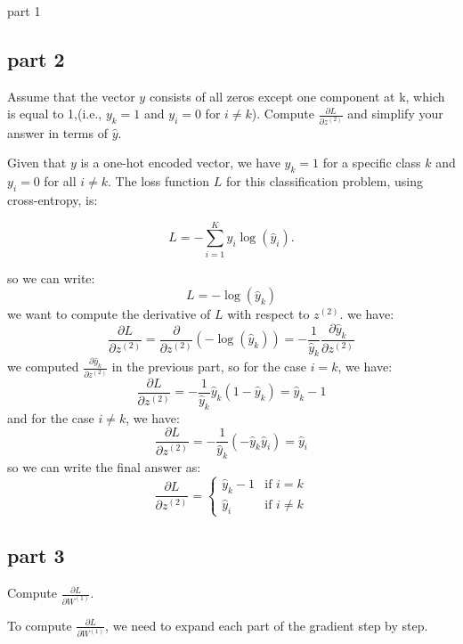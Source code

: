 \begin{subsection}{part 1}
\subsection{part 2}
Assume that the vector \( y \) consists of all zeros except one component at k, which is equal to 1,(i.e., $y_k = 1$ and $y_i = 0$ for $i \neq k$). Compute $\frac{\partial L}{\partial z^{(2)}}$ and simplify your answer in terms of $\hat{y}$.
\begin{qsolve}
	\begin{qsolve}[]
		Given that \( y \) is a one-hot encoded vector, we have \( y_k = 1 \) for a specific class \( k \) and \( y_i = 0 \) for all \( i \neq k \). The loss function \( L \) for this classification problem, using cross-entropy, is:

		\[
		L = -\sum_{i=1}^K y_i \log(\hat{y}_i).
		\]
		
		so we can write:
		\[
		L = -\log(\hat{y}_k)
		\]
		we want to compute the derivative of \( L \) with respect to \( z^{(2)} \). we have:
		\[
		\frac{\partial L}{\partial z^{(2)}} = \frac{\partial}{\partial z^{(2)}} \left( -\log(\hat{y}_k) \right) = -\frac{1}{\hat{y}_k} \frac{\partial \hat{y}_k}{\partial z^{(2)}}
		\]
		we computed \( \frac{\partial \hat{y}_k}{\partial z^{(2)}} \) in the previous part, so for the case \( i = k \), we have:
		\[
		\frac{\partial L}{\partial z^{(2)}} = -\frac{1}{\hat{y}_k} \hat{y}_k \left( 1 - \hat{y}_k \right) = \hat{y}_k - 1
		\]
		and for the case \( i \neq k \), we have:
		\splitqsolve[\splitqsolve]
		\[
		\frac{\partial L}{\partial z^{(2)}} = -\frac{1}{\hat{y}_k} \left( -\hat{y}_k \hat{y}_i \right) = \hat{y}_i
		\]
		so we can write the final answer as:
		\[
		\frac{\partial L}{\partial z^{(2)}} = \begin{cases}
			\hat{y}_k - 1 & \text{if } i = k\\
			\hat{y}_i & \text{if } i \neq k
		\end{cases}
		\]


	\end{qsolve}
\end{qsolve}
\subsection{part 3}
Compute \( \frac{\partial L}{\partial W^{(1)}} \).
\begin{qsolve}
	\begin{qsolve}[]
		To compute \( \frac{\partial L}{\partial W^{(1)}} \), we need to expand each part of the gradient step by step.


\end{qsolve}
\end{qsolve}
\end{subsection}
